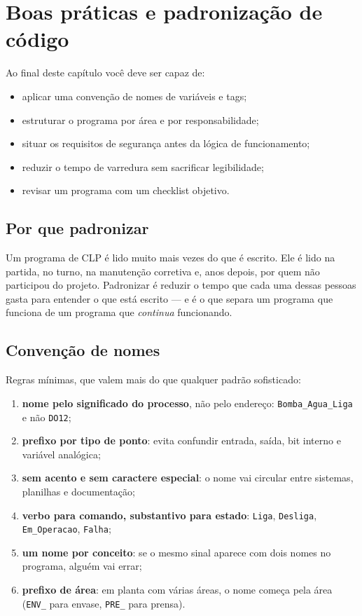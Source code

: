 \chapter{Boas práticas e padronização de código}
\label{cap:boas-praticas}

\begin{objetivos}
Ao final deste capítulo você deve ser capaz de:
\begin{itemize}
  \item aplicar uma convenção de nomes de variáveis e tags;
  \item estruturar o programa por área e por responsabilidade;
  \item situar os requisitos de segurança antes da lógica de funcionamento;
  \item reduzir o tempo de varredura sem sacrificar legibilidade;
  \item revisar um programa com um checklist objetivo.
\end{itemize}
\end{objetivos}

\section{Por que padronizar}

Um programa de CLP é lido muito mais vezes do que é escrito. Ele é lido na partida, no turno,
na manutenção corretiva e, anos depois, por quem não participou do projeto. Padronizar é reduzir o
tempo que cada uma dessas pessoas gasta para entender o que está escrito --- e é o que separa um
programa que funciona de um programa que \emph{continua} funcionando.


\section{Convenção de nomes}

Regras mínimas, que valem mais do que qualquer padrão sofisticado:

\begin{enumerate}
  \item \textbf{nome pelo significado do processo}, não pelo endereço: \texttt{Bomba\_Agua\_Liga} e
        não \texttt{DO12};
  \item \textbf{prefixo por tipo de ponto}: evita confundir entrada, saída, bit interno e variável
        analógica;
  \item \textbf{sem acento e sem caractere especial}: o nome vai circular entre sistemas, planilhas e
        documentação;
  \item \textbf{verbo para comando, substantivo para estado}: \texttt{Liga}, \texttt{Desliga},
        \texttt{Em\_Operacao}, \texttt{Falha};
  \item \textbf{um nome por conceito}: se o mesmo sinal aparece com dois nomes no programa, alguém vai
        errar;
  \item \textbf{prefixo de área}: em planta com várias áreas, o nome começa pela área
        (\texttt{ENV\_} para envase, \texttt{PRE\_} para prensa).
\end{enumerate}

